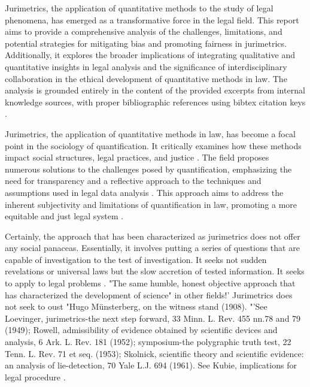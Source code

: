 Jurimetrics, the application of quantitative methods to the study of legal phenomena, has emerged as a transformative force in the legal field. This report aims to provide a comprehensive analysis of the challenges, limitations, and potential strategies for mitigating bias and promoting fairness in jurimetrics. Additionally, it explores the broader implications of integrating qualitative and quantitative insights in legal analysis and the significance of interdisciplinary collaboration in the ethical development of quantitative methods in law. The analysis is grounded entirely in the content of the provided excerpts from internal knowledge sources, with proper bibliographic references using bibtex citation keys \cite{10.20396/rdbci.v18i0.8658889, 10.32586/rcda.v18i1.585, 10.1007/s11186-021-09453-1, demortain2019politics, 10.3390/fi9040068}.

Jurimetrics, the application of quantitative methods in law, has become a focal point in the sociology of quantification. It critically examines how these methods impact social structures, legal practices, and justice \cite{10.20396/rdbci.v18i0.8658889, 10.32586/rcda.v18i1.585}. The field proposes numerous solutions to the challenges posed by quantification, emphasizing the need for transparency and a reflective approach to the techniques and assumptions used in legal data analysis \cite{10.1007/s11186-021-09453-1, demortain2019politics, 10.3390/fi9040068}. This approach aims to address the inherent subjectivity and limitations of quantification in law, promoting a more equitable and just legal system \cite{10.1007/s11186-021-09453-1, demortain2019politics}.

Certainly, the approach that has been characterized as jurimetrics does not offer any social panaceas. Essentially, it involves putting a series of questions that are capable of investigation to the test of investigation. It seeks not sudden revelations or universal laws but the slow accretion of tested information. It seeks to apply to legal problems \cite{10_2307_1190721}. "The same humble, honest objective approach that has characterized the development of science" in other fields!' Jurimetrics does not seek to oust "Hugo Münsterberg, on the witness stand (1908). "'See Loevinger, jurimetrics-the next step forward, 33 Minn. L. Rev. 455 nn.78 and 79 (1949); Rowell, admissibility of evidence obtained by scientific devices and analysis, 6 Ark. L. Rev. 181 (1952); symposium-the polygraphic truth test, 22 Tenn. L. Rev. 71 et seq. (1953); Skolnick, scientific theory and scientific evidence: an analysis of lie-detection, 70 Yale L.J. 694 (1961). See Kubie, implications for legal procedure \cite{10_2307_1190721}.

